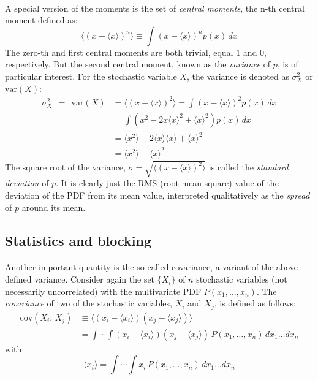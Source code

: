 \documentclass[%
twoside,                 %
final,                   %
10pt]{article}
\begin{document}
\paragraph{}
A special version of the moments is the set of \emph{central moments},
the n-th central moment defined as:
\[
\langle (x-\langle x \rangle )^n\rangle \equiv \int\! (x-\langle x\rangle)^n p(x)\,dx
\]
The zero-th and first central moments are both trivial, equal $1$ and
$0$, respectively. But the second central moment, known as the
\emph{variance} of $p$, is of particular interest. For the stochastic
variable $X$, the variance is denoted as $\sigma^2_X$ or $\mathrm{var}(X)$:
\begin{align}
\sigma^2_X\ \ =\ \ \mathrm{var}(X) & =  \langle (x-\langle x\rangle)^2\rangle =
\int\! (x-\langle x\rangle)^2 p(x)\,dx\\
& =  \int\! \left(x^2 - 2 x \langle x\rangle^{2} +
  \langle x\rangle^2\right)p(x)\,dx\\
& =  \langle x^2\rangle - 2 \langle x\rangle\langle x\rangle + \langle x\rangle^2\\
& =  \langle x^2\rangle - \langle x\rangle^2
\end{align}
The square root of the variance, $\sigma =\sqrt{\langle (x-\langle x\rangle)^2\rangle}$ is called the \emph{standard deviation} of $p$. It is clearly just the RMS (root-mean-square)
value of the deviation of the PDF from its mean value, interpreted
qualitatively as the \emph{spread} of $p$ around its mean.



\subsection*{Statistics and blocking}

\paragraph{}
Another important quantity is the so called covariance, a variant of
the above defined variance. Consider again the set $\{X_i\}$ of $n$
stochastic variables (not necessarily uncorrelated) with the
multivariate PDF $P(x_1,\dots,x_n)$. The \emph{covariance} of two
of the stochastic variables, $X_i$ and $X_j$, is defined as follows:
\begin{align}
\mathrm{cov}(X_i,\,X_j) &\equiv \langle (x_i-\langle x_i\rangle)(x_j-\langle x_j\rangle)\rangle
\nonumber\\
&=
\int\!\cdots\!\int\!(x_i-\langle x_i \rangle)(x_j-\langle x_j \rangle)\,
P(x_1,\dots,x_n)\,dx_1\dots dx_n
\label{eq:def_covariance}
\end{align}
with
\[
\langle x_i\rangle =
\int\!\cdots\!\int\!x_i\,P(x_1,\dots,x_n)\,dx_1\dots dx_n
\]
\end{document}
